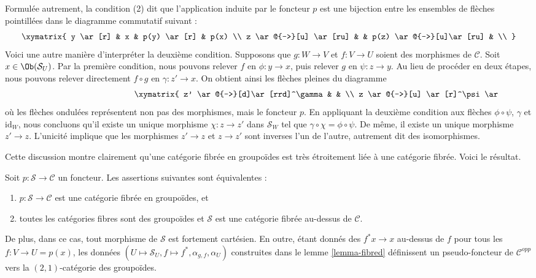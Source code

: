 \noindent
Formulée autrement, la condition (2) dit que
l'application induite par le foncteur $p$ est une bijection entre les ensembles
de flèches pointillées dans le diagramme commutatif suivant :
$$
\xymatrix{
y \ar[r] & x & p(y) \ar[r] & p(x) \\
z \ar@{-->}[u] \ar[ru] & & p(z) \ar@{-->}[u]\ar[ru] & \\
}
$$
Voici une autre manière d'interpréter la deuxième condition.
Supposons que $g : W \to V$ et $f : V \to U$ soient des morphismes de $\mathcal{C}$.
Soit $x \in \Ob(\mathcal{S}_U)$. Par la première condition, nous pouvons relever
$f$ en $ \phi : y \to x$, puis relever $g$ en $\psi : z \to y$.
Au lieu de procéder en deux étapes, nous pouvons relever directement $f \circ g$ en
$\gamma : z' \to x$. On obtient ainsi les flèches pleines du diagramme
\begin{equation}
\label{equation-fibred-groupoids}
\vcenter{
\xymatrix{
z' \ar@{-->}[d]\ar[rrd]^\gamma & & \\
z \ar@{-->}[u] \ar[r]^\psi \ar@{~>}[d]^p &
y \ar[r]^\phi \ar@{~>}[d]^p &
x \ar@{~>}[d]^p
\\
W \ar[r]^g & V \ar[r]^f & U \\
}
}
\end{equation}
où les flèches ondulées représentent non pas des morphismes, mais le foncteur $p$.
En appliquant la deuxième condition aux flèches $\phi \circ \psi$, $\gamma$
et $\text{id}_W$, nous concluons qu'il existe un unique morphisme
$\chi : z \to z'$ dans $\mathcal{S}_W$ tel que
$\gamma \circ \chi = \phi \circ \psi$. De même, il existe un unique morphisme
$z' \to z$. L'unicité implique que les morphismes $z' \to z$ et
$z\to z'$ sont inverses l'un de l'autre, autrement dit des isomorphismes.

\medskip\noindent
Cette discussion montre clairement qu'une
catégorie fibrée en groupoïdes est très étroitement liée
à une catégorie fibrée. Voici le résultat.

\begin{lemma}
\label{lemma-fibred-groupoids}
Soit $p : \mathcal{S} \to \mathcal{C}$ un foncteur.
Les assertions suivantes sont équivalentes :
\begin{enumerate}
\item $p : \mathcal{S} \to \mathcal{C}$ est une catégorie
fibrée en groupoïdes, et
\item toutes les catégories fibres sont des groupoïdes et
$\mathcal{S}$ est une catégorie fibrée au-dessus de $\mathcal{C}$.

\end{enumerate}
De plus, dans ce cas, tout morphisme de $\mathcal{S}$ est
fortement cartésien. En outre, étant donnés des $f^\ast x \to x$
au-dessus de $f$ pour tous les $f: V \to U = p(x)$, les données
$(U \mapsto \mathcal{S}_U, f \mapsto f^*, \alpha_{g, f}, \alpha_U)$
construites dans le lemme \ref{lemma-fibred}
définissent un pseudo-foncteur de $\mathcal{C}^{opp}$ vers
la $(2, 1)$-catégorie des groupoïdes.
\end{lemma}

